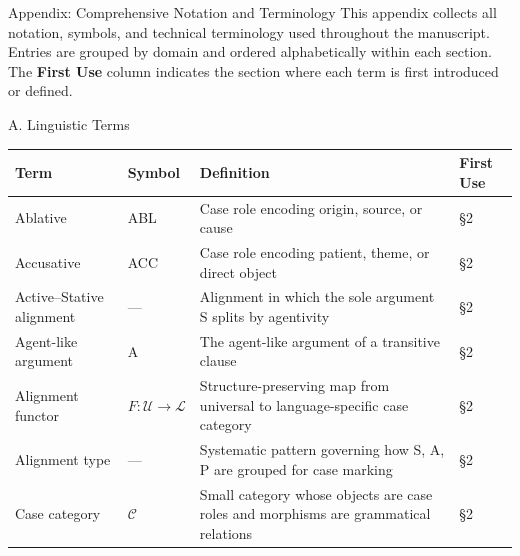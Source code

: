 \documentclass[
  ignorenonframetext,
]{beamer}
\author{\texorpdfstring{}{}}
\date{}
\newcounter{none} %
\begin{document}
\begin{frame}{Appendix: Comprehensive Notation and Terminology}
\protect{}\label{sec:notation}
This appendix collects all notation, symbols, and technical terminology
used throughout the manuscript. Entries are grouped by domain and
ordered alphabetically within each section. The \textbf{First Use}
column indicates the section where each term is first introduced or
defined.

\begin{block}{A. Linguistic Terms}
\protect{}\label{a.-linguistic-terms}
{\def\LTcaptype{none} %
\begin{longtable}[]{@{}
  >{\raggedright\arraybackslash}p{}
  >{\centering\arraybackslash}p{}
  >{\raggedright\arraybackslash}p{}
  >{\centering\arraybackslash}p{}@{}}
\toprule\noalign{}
\begin{minipage}[b]{\linewidth}\raggedright
Term
\end{minipage} & \begin{minipage}[b]{\linewidth}\centering
Symbol
\end{minipage} & \begin{minipage}[b]{\linewidth}\raggedright
Definition
\end{minipage} & \begin{minipage}[b]{\linewidth}\centering
First Use
\end{minipage} \\
\midrule\noalign{}
\endhead
Ablative & ABL & Case role encoding origin, source, or cause & §2 \\
Accusative & ACC & Case role encoding patient, theme, or direct object &
§2 \\
Active--Stative alignment & --- & Alignment in which the sole argument S
splits by agentivity & §2 \\
Agent-like argument & A & The agent-like argument of a transitive clause
& §2 \\
Alignment functor & \(F: \mathcal{U} \to \mathcal{L}\) &
Structure-preserving map from universal to language-specific case
category & §2 \\
Alignment type & --- & Systematic pattern governing how S, A, P are
grouped for case marking & §2 \\
Case category & \(\mathcal{C}\) & Small category whose objects are case
roles and morphisms are grammatical relations & §2 \\

\end{longtable}}
\end{block}
\end{frame}
\end{document}
